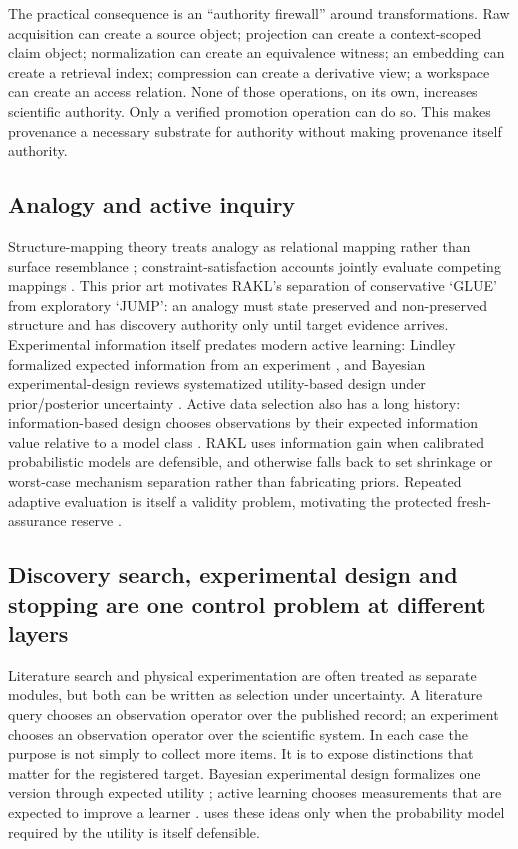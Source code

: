 The practical consequence is an ``authority firewall'' around transformations. Raw acquisition can create a source object; projection can create a context-scoped claim object; normalization can create an equivalence witness; an embedding can create a retrieval index; compression can create a derivative view; a workspace can create an access relation. None of those operations, on its own, increases scientific authority. Only a verified promotion operation can do so. This makes provenance a necessary substrate for authority without making provenance itself authority.

\subsection{Analogy and active inquiry}
Structure-mapping theory treats analogy as relational mapping rather than surface resemblance \cite{gentner1983}; constraint-satisfaction accounts jointly evaluate competing mappings \cite{holyoak1989}. This prior art motivates RAKL's separation of conservative `GLUE' from exploratory `JUMP': an analogy must state preserved and non-preserved structure and has discovery authority only until target evidence arrives. Experimental information itself predates modern active learning: Lindley formalized expected information from an experiment \cite{lindley1956}, and Bayesian experimental-design reviews systematized utility-based design under prior/posterior uncertainty \cite{chaloner1995}. Active data selection also has a long history: information-based design chooses observations by their expected information value relative to a model class \cite{mackay1992}. RAKL uses information gain when calibrated probabilistic models are defensible, and otherwise falls back to set shrinkage or worst-case mechanism separation rather than fabricating priors. Repeated adaptive evaluation is itself a validity problem, motivating the protected fresh-assurance reserve \cite{dwork2015}.

\subsection{Discovery search, experimental design and stopping are one control problem at different layers}

Literature search and physical experimentation are often treated as separate modules, but both can be written as selection under uncertainty. A literature query chooses an observation operator over the published record; an experiment chooses an observation operator over the scientific system. In each case the purpose is not simply to collect more items. It is to expose distinctions that matter for the registered target. Bayesian experimental design formalizes one version through expected utility \cite{lindley1956,chaloner1995}; active learning chooses measurements that are expected to improve a learner \cite{mackay1992}. \RAKL{} uses these ideas only when the probability model required by the utility is itself defensible.


